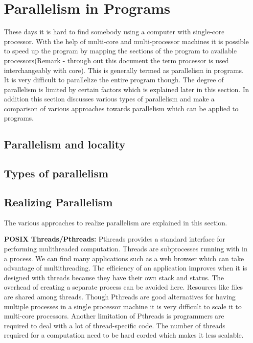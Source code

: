 \label{chap:background}

\section{Parallelism in Programs}
These days it is hard to find somebody using a computer with single-core processor.
With the help of multi-core and multi-processor machines it is possible to speed up 
the program by mapping the sections of the program to available processors(Remark - 
through out this document the term processor is used interchangeably with core). This 
is generally termed as parallelism in programs. It is very difficult to parallelize
the entire program though. The degree of parallelism is limited by certain factors which is
explained later in this section. In addition this section discusses various types of parallelism and
make a comparison of various approaches towards parallelism which can be applied to programs.

\subsection{Parallelism and locality}

\subsection{Types of parallelism}

\subsection{Realizing Parallelism}

The various approaches to realize parallelism are explained in this section.

\textbf{POSIX Threads/Pthreads:} Pthreads provides a standard interface for performing mulithreaded computation. 
Threads are subprocesses running with in a process. 
We can find many applications such as a web browser which can take advantage of multithreading.
The efficiency of an application improves when it is designed with threads because they have their
own stack and status. The overhead of creating a separate process can be avoided here.
Resources like files are shared among threads. Though Pthreads are good alternatives for
having multiple processes in a single processor machine it is very difficult to scale
it to multi-core processors. Another limitation of Pthreads is programmers are required to
deal with a lot of thread-specific code. The number of threads required for a computation
need to be hard corded which makes it less scalable.

